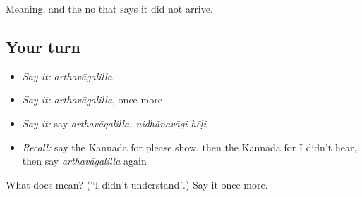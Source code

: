 \begin{grammarlens}[title={What you've built}]
Meaning, and the no that says it did not arrive.
\end{grammarlens}

\subsection*{Your turn}
\begin{itemize}
\raggedright
  \item \emph{Say it:} \emph{arthavāgalilla}
  \item \emph{Say it:} \emph{arthavāgalilla}, once more
  \item \emph{Say it:} say \emph{arthavāgalilla, nidhānavāgi hēḷi}
  \item \emph{Recall:} say the Kannada for please show, then the Kannada for I didn't hear, then say \emph{arthavāgalilla} again
\end{itemize}

\begin{tcolorbox}[breakable,colback=teal!4,colframe=teal!35!black,title={Before you move on}]
What does  mean? (\textquotedblleft{}I didn't understand\textquotedblright{}.) Say it once more.
\end{tcolorbox}
